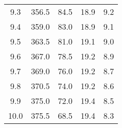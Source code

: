 \begin{table}
\begin{tabular}{c c c c c}
    9.3&356.5& 84.5   &  18.9    &    9.2    \\    
    9.4&359.0& 83.0   &  18.9    &    9.1    \\    
    9.5&363.5& 81.0   &  19.1    &    9.0    \\    
    9.6&367.0& 78.5   &  19.2    &    8.9    \\    
    9.7&369.0& 76.0   &  19.2    &    8.7    \\    
    9.8&370.5& 74.0   &  19.2    &    8.6    \\    
    9.9&375.0& 72.0   &  19.4    &    8.5    \\    
    10.0&375.5 & 68.5 &  19.4    &    8.3  \\
    \bottomrule
\end{tabular}
\end{table}

